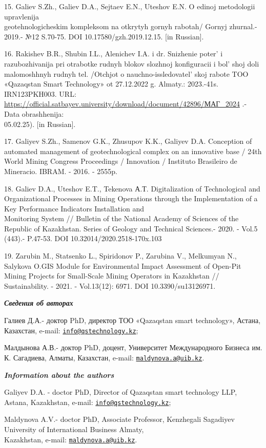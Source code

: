 \begin{references}
15. Galiev S.Zh., Galiev D.A., Sejtaev E.N., Uteshov E.N. O edinoj
metodologii upravlenija \\geotehnologicheskim kompleksom na otkrytyh
gornyh rabotah/ Gornyj zhurnal.- 2019.- №12 S.70-75. DOI
10.17580/gzh.2019.12.15. {[}in Russian{]}.

16. Rakishev B.R., Shubin I.L., Alenichev I.A. i dr. Snizhenie
poter'{} i razubozhivanija pri otrabotke rudnyh blokov
slozhnoj konfiguracii i bol' shoj doli malomoshhnyh
rudnyh tel. /Otchjot o nauchno-issledovatel' skoj rabote
TOO «Qazaqstan Smart Technology» ot 27.12.2022 g. Almaty.: 2023.-41s.
IRN123PKH003. URL:
\url{https://official.satbayev.university/download/document/42896/МАГ_2024}
.- Data obrashhenija: \\05.02.25). {[}in Russian{]}.

17. Galiyev S.Zh., Samenov G.K., Zhusupov K.K., Galiyev D.A. Conception
of automated management of geotechnological complex on an innovative
base / 24th World Mining Congress Proceedings / Innovation / Instituto
Brasileiro de Mineracio. IBRAM. - 2016. - 2555p.

18. Galiev D.A., Uteshov E.T., Tekenova А.Т. Digitalization of
Technological and Organizational Processes in Mining Operations through
the Implementation of a Key Performance Indicators Installation and\\
Monitoring System // Bulletin of the National Academy of Sciences of the
Republic of Kazakhstan. Series of Geology and Technical Sciences.-
2020. - Vol.5 (443).- P.47-53. DOI 10.32014/2020.2518-170x.103

19. Zarubin M., Statsenko L., Spiridonov P., Zarubina V., Melkumyan N.,
Salykova O.GIS Module for Environmental Impact Assessment of Open-Pit
Mining Projects for Small-Scale Mining Operators in Kazakhstan //
Sustainability. - 2021. - Vol.13(12): 6971. DOI 10.3390/su13126971.
\end{references}

\begin{authorinfo}
\emph{{\bfseries Сведения об авторах}}

Галиев Д.А.- доктор PhD, директор ТОО «Qazaqstan smart technology»,
Астана, Казахстан, e-mail:
\href{mailto:info@qstechnology.kz}{\nolinkurl{info@qstechnology.kz}};

Малдынова А.В.- доктор PhD, доцент, Университет Международного Бизнеса
им. К. Сагадиева, Алматы, Казахстан, e-mail:
\href{mailto:maldynova.a@uib.kz}{\nolinkurl{maldynova.a@uib.kz}}.


\emph{{\bfseries Information about the authors}}

Galiyev D.A. - doctor PhD, Director of Qazaqstan smart technology LLP,
Astana, Kazakhstan, e-mail:
\href{mailto:info@qstechnology.kz}{\nolinkurl{info@qstechnology.kz}};

Maldynova A.V.- doctor PhD, Associate Professor, Kenzhegali Sagadiyev
University of International Business Almaty, \\Kazakhstan, e-mail:
\href{mailto:maldynova.a@uib.kz}{\nolinkurl{maldynova.a@uib.kz}}.
\end{authorinfo}
